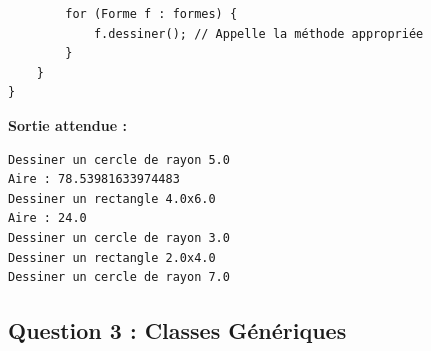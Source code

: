 \documentclass[11pt,a4paper]{article}
\begin{document}
\begin{correctionbox}
\begin{lstlisting}
        for (Forme f : formes) {
            f.dessiner(); // Appelle la méthode appropriée
        }
    }
}
\end{lstlisting}

\textbf{Sortie attendue :}
\begin{verbatim}
Dessiner un cercle de rayon 5.0
Aire : 78.53981633974483
Dessiner un rectangle 4.0x6.0
Aire : 24.0
Dessiner un cercle de rayon 3.0
Dessiner un rectangle 2.0x4.0
Dessiner un cercle de rayon 7.0
\end{verbatim}
\end{correctionbox}

\subsection{Question 3 : Classes Génériques}
\end{document}
